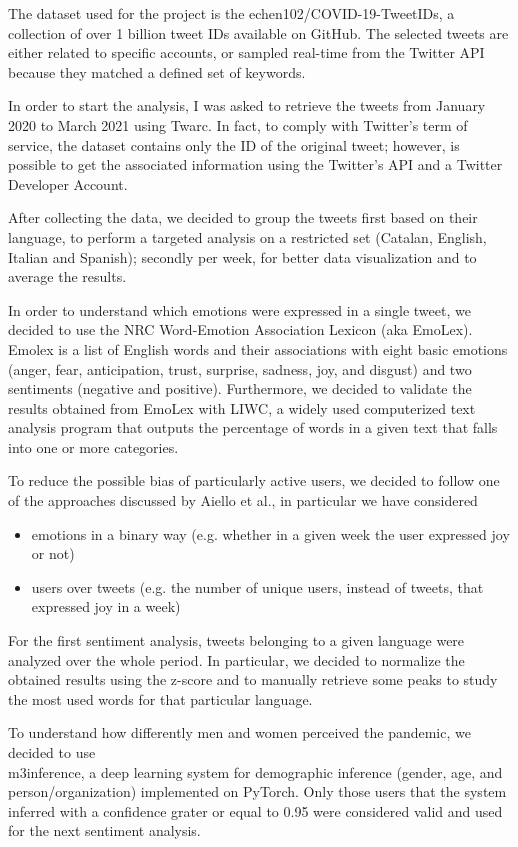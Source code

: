 The dataset used for the project is the echen102/COVID-19-TweetIDs, a collection of over 1 billion tweet IDs available on GitHub. The selected tweets are either related to specific accounts, or sampled real-time from the Twitter API because they matched a defined set of keywords.

In order to start the analysis, I was asked to retrieve the tweets from January 2020 to March 2021 using Twarc. In fact, to comply with Twitter's term of service, the dataset contains only the ID of the original tweet; however, is possible to get the associated information using the Twitter's API and a Twitter Developer Account.

After collecting the data, we decided to group the tweets first based on their language, to perform a targeted analysis on a restricted set (Catalan, English, Italian and Spanish); secondly per week, for better data visualization and to average the results.

In order to understand which emotions were expressed in a single tweet, we decided to use the NRC Word-Emotion Association Lexicon (aka EmoLex). Emolex is a list of English words and their associations with eight basic emotions (anger, fear, anticipation, trust, surprise, sadness, joy, and disgust) and two sentiments (negative and positive). Furthermore, we decided to validate the results obtained from EmoLex with LIWC, a widely used computerized text analysis program that outputs the percentage of words in a given text that falls into one or more categories.

To reduce the possible bias of particularly active users, we decided to follow one of the approaches discussed by Aiello et al., in particular we have considered
	
\begin{itemize}
	\item emotions in a binary way (e.g. whether in a given week the user expressed joy or not)
	\item users over tweets (e.g. the number of unique users, instead of tweets, that expressed joy in a week)
\end{itemize}

For the first sentiment analysis, tweets belonging to a given language were analyzed over the whole period. In particular, we decided to normalize the obtained results using the z-score and to manually retrieve some peaks to study the most used words for that particular language.

To understand how differently men and women perceived the pandemic, we decided to use\\ m3inference, a deep learning system for demographic inference (gender, age, and person/organization) implemented on PyTorch. Only those users that the system inferred with a confidence grater or equal to 0.95 were considered valid and used for the next sentiment analysis.

